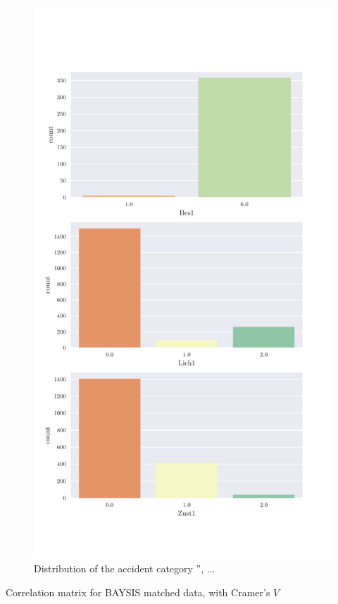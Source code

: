 \documentclass[a4paper,headsepline,footsepline,fontsize=11pt,BCOR=12mm,DIV=12]{report}
\begin{document}
\begin{appendices}
\begin{figure}[h]
	\centering
	\includegraphics[scale=0.7]{../CorrAnalysis/data/BAYSIS/02_matched/plots/baysis_matched_count_multiple04}
	\caption{Distribution of the accident category '', ...}
	\label{img:appendix_baysis_matched_04}
\end{figure}
\begin{table}
	\tiny
	\setlength{\tabcolsep}{2pt}
	\centering
	
	\caption{Correlation matrix for BAYSIS matched data, with Cramer's $V$}
	\label{table:appendix_correlation_matrix_matched_cramers}
\end{table}


\end{appendices}
\end{document}
